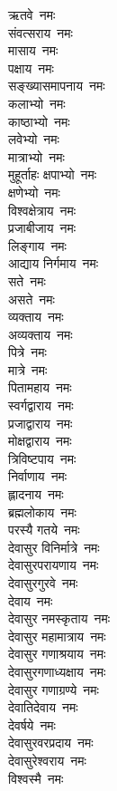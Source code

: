 \begin{multicols}{2}
\begin{flushleft}
ऋतवे~नमः\\
संवत्सराय~नमः\\
मासाय~नमः\\
पक्षाय~नमः\\
सङ्ख्यासमापनाय~नमः\\
कलाभ्यो~नमः\hfill{}\\
काष्ठाभ्यो~नमः\\
लवेभ्यो~नमः\\
मात्राभ्यो~नमः\\
मुहूर्ताहः क्षपाभ्यो~नमः\\
क्षणेभ्यो~नमः\\
विश्वक्षेत्राय~नमः\\
प्रजाबीजाय~नमः\\
लिङ्गाय~नमः\\
आद्याय निर्गमाय~नमः\\
सते~नमः\hfill{}\\
असते~नमः\\
व्यक्ताय~नमः\\
अव्यक्ताय~नमः\\
पित्रे~नमः\\
मात्रे~नमः\\
पितामहाय~नमः\\
स्वर्गद्वाराय~नमः\\
प्रजाद्वाराय~नमः\\
मोक्षद्वाराय~नमः\\
त्रिविष्टपाय~नमः\hfill{}\\
निर्वाणाय~नमः\\
ह्लादनाय~नमः\\
ब्रह्मलोकाय~नमः\\
परस्यै गतये~नमः\\
देवासुर विनिर्मात्रे~नमः\\
देवासुरपरायणाय~नमः\\
देवासुरगुरवे~नमः\\
देवाय~नमः\\
देवासुर नमस्कृताय~नमः\\
देवासुर महामात्राय~नमः\hfill{}\\
देवासुर गणाश्रयाय~नमः\\
देवासुरगणाध्यक्षाय~नमः\\
देवासुर गणाग्रण्ये~नमः\\
देवातिदेवाय~नमः\\
देवर्षये~नमः\\
देवासुरवरप्रदाय~नमः\\
देवासुरेश्वराय~नमः\\
विश्वस्मै~नमः\\

\end{flushleft}
\end{multicols}
